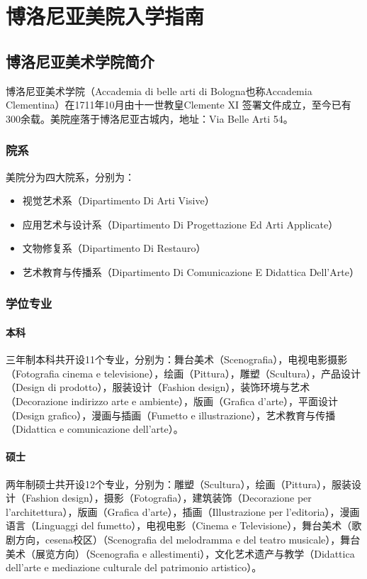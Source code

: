 \chapter{博洛尼亚美院入学指南}              


\section{博洛尼亚美术学院简介}
博洛尼亚美术学院（Accademia di belle arti di Bologna也称Accademia Clementina）在1711年10月由十一世教皇Clemente XI 签署文件成立，至今已有300余载。美院座落于博洛尼亚古城内，地址：Via Belle Arti 54。

\subsection{院系}
美院分为四大院系，分别为：

\begin{itemize}
\item 视觉艺术系（Dipartimento Di Arti Visive）
\item 应用艺术与设计系（Dipartimento Di Progettazione Ed Arti Applicate）
\item 文物修复系（Dipartimento Di Restauro）
\item 艺术教育与传播系（Dipartimento Di Comunicazione E Didattica Dell’Arte）
\end{itemize}

\subsection{学位专业}

\subsubsection{本科}
三年制本科共开设11个专业，分别为：舞台美术（Scenografia），电视电影摄影（Fotografia cinema e televisione），绘画（Pittura），雕塑（Scultura），产品设计（Design di prodotto），服装设计（Fashion design），装饰环境与艺术（Decorazione indirizzo arte e ambiente），版画（Grafica d’arte），平面设计（Design grafico），漫画与插画（Fumetto e illustrazione），艺术教育与传播（Didattica e comunicazione dell’arte）。
      
\subsubsection{硕士}
两年制硕士共开设12个专业，分别为：雕塑（Scultura），绘画（Pittura），服装设计（Fashion design），摄影（Fotografia），建筑装饰（Decorazione per l’architettura），版画（Grafica d’arte），插画（Illustrazione per l’editoria），漫画语言（Linguaggi del fumetto），电视电影（Cinema e Televisione），舞台美术（歌剧方向，cesena校区）（Scenografia del melodramma e del teatro musicale），舞台美术（展览方向）（Scenografia e allestimenti），文化艺术遗产与教学（Didattica dell’arte e mediazione culturale del patrimonio artistico）。

